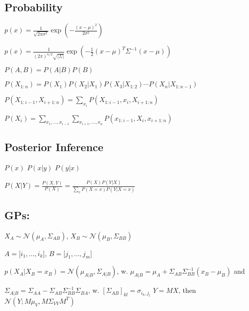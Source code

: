 \subsection*{Probability}
 $p(x)=\frac{1}{\sqrt{2\pi\sigma ^2}}\exp(-\frac{(x-\mu)^2}{2\sigma^2})$

$p(x)=\frac{1}{(2\pi)^{n/2}\sqrt{|\Sigma|}}\exp(-\frac{1}{2}(x-\mu)^T\Sigma^{-1}(x-\mu))$

 $P(A,B)=P(A|B)P(B)$

$P(X_{1:n})=P(X_1)P(X_2|X_1)P(X_3|X_{1:2})\cdots P(X_n|X_{1:n-1})$

 $P(X_{1:i-1},X_{i+1:n})=\sum_{x_i}P(X_{1:i-1},x_i,X_{i+1:n})$

$P(X_i)=\sum_{x_1,\dots,x_{i-1}}\sum_{x_{i+1},\dots,x_n}P(x_{1:i-1},X_i,x_{i+1:n})$
\subsection*{Posterior Inference}
 $P(x)$
 $P(x|y)$
 $P(y|x)$

 $P(X|Y)=\frac{P(X,Y)}{P(X)}=\frac{P(X)P(Y|X)}{\sum_x P(X=x)P(Y|X=x)}$

\subsection*{GPs:}
$X_A\sim\mathcal{N}(\mu_A,\Sigma_{AB})$, $X_B\sim\mathcal{N}(\mu_B,\Sigma_{BB})$

$A=\lbrack i_1,\dots,i_k \rbrack$, $B=\lbrack j_1,\dots,j_m \rbrack$

$p(X_A|X_B=x_B)=\mathcal{N}(\mu_{A|B},\Sigma_{A|B})$, w.
$\mu_{A|B}=\mu_A + \Sigma_{AB}\Sigma_{BB}^{-1}(x_B-\mu_B)$ and 

$\Sigma_{A|B}=\Sigma_{AA}-\Sigma_{AB}\Sigma_{BB}^{-1}\Sigma_{BA}$, w. $[\Sigma_{AB}]_{kl}=\sigma_{i_k,j_l}$
 $Y = MX$, then  $ \mathcal{N}(Y; M\mu_{V},M\Sigma_{VV}M^{T})$
